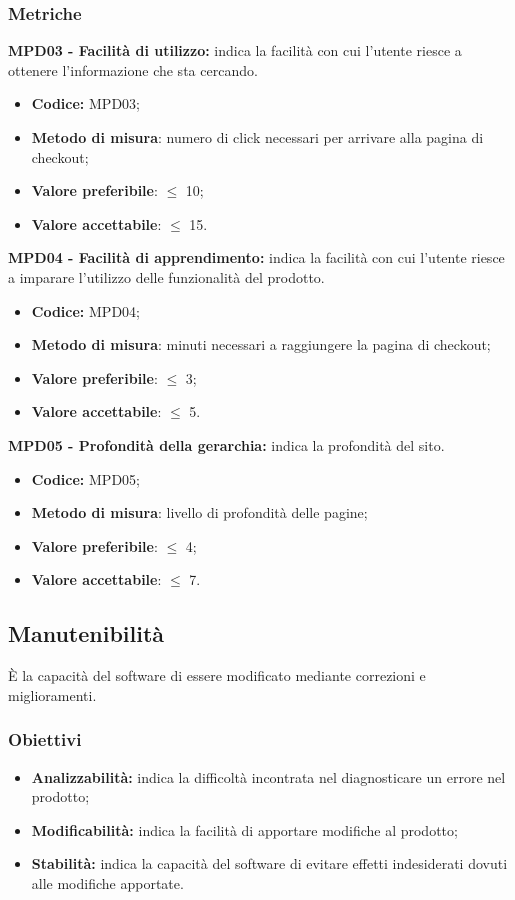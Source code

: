\subsubsection{Metriche}
\textbf{MPD03 - Facilità di utilizzo:} indica la facilità con cui l'utente riesce a ottenere l'informazione che sta cercando.
\begin{itemize}
    \item \textbf{Codice:} MPD03;
    \item \textbf{Metodo di misura}: numero di click necessari per arrivare alla pagina di checkout;
    \item \textbf{Valore preferibile}: $\leq$ 10;
    \item \textbf{Valore accettabile}: $\leq$ 15.
\end{itemize}
\textbf{MPD04 - Facilità di apprendimento:} indica la facilità con cui l'utente riesce a imparare l'utilizzo delle funzionalità del prodotto.
\begin{itemize}
    \item \textbf{Codice:} MPD04;
    \item \textbf{Metodo di misura}: minuti necessari a raggiungere la pagina di checkout;
    \item \textbf{Valore preferibile}: $\leq$ 3;
    \item \textbf{Valore accettabile}: $\leq$ 5.
\end{itemize}
\textbf{MPD05 - Profondità della gerarchia:} indica la profondità del sito.
\begin{itemize}
    \item \textbf{Codice:} MPD05;
    \item \textbf{Metodo di misura}: livello di profondità delle pagine;
    \item \textbf{Valore preferibile}: $\leq$ 4;
    \item \textbf{Valore accettabile}: $\leq$ 7.
\end{itemize}
\subsection{Manutenibilità}
È la capacità del software di essere modificato mediante correzioni e miglioramenti.
\subsubsection{Obiettivi}
\begin{itemize}
    \item \textbf{Analizzabilità:} indica la difficoltà incontrata nel diagnosticare un errore nel prodotto;
    \item \textbf{Modificabilità:} indica la facilità di apportare modifiche al prodotto;
    \item \textbf{Stabilità:} indica la capacità del software di evitare effetti indesiderati dovuti alle modifiche apportate.
\end{itemize}
